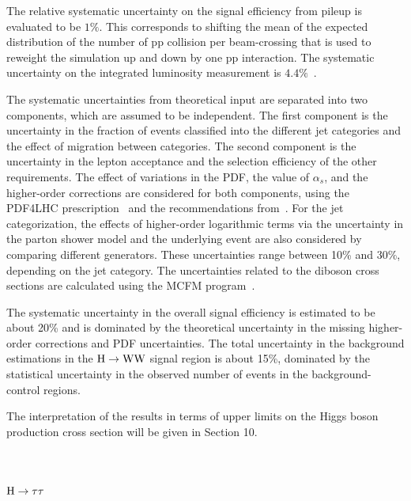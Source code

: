 \documentclass[12pt,twoside,a4paper,cmspaper,final,collab]{cms-tdr}
\begin{document}
The relative systematic uncertainty on the signal efficiency from pileup is evaluated to be $1\%$.
This corresponds to shifting the mean of the
expected distribution of the number of pp collision per beam-crossing that is used to reweight the simulation
up and down by one pp interaction.
The systematic uncertainty on the integrated luminosity measurement is $4.4\%$~\cite{CMS:2012jza}.

The systematic uncertainties from theoretical input  are separated
into two components, which are assumed to be
independent. The first component is the uncertainty in the fraction of
events classified into the different jet categories and the effect of migration between categories.
The second component is the uncertainty in
the lepton acceptance and the selection efficiency of the other
requirements. The effect of variations in the PDF, the
value of $\alpha_{s}$, and the higher-order corrections
are considered for both components, using the PDF4LHC
prescription~\cite{Botje:2011sn,Alekhin:2011sk,Lai:2010vv,Martin:2009iq,Ball:2011mu} and the recommendations
from~\cite{LHCHiggsCrossSectionWorkingGroup:2011ti}.
For the jet categorization, the effects of higher-order logarithmic terms via
the uncertainty in the parton shower model and the underlying event
are also considered by comparing different generators. These uncertainties range
between 10\% and 30\%, depending on the jet category.
The uncertainties related to the diboson
cross sections are calculated using the {\sc MCFM} program~\cite{MCFM}.

The systematic uncertainty in the overall signal efficiency is estimated to be about 20\%
and is dominated by the theoretical uncertainty in the missing
higher-order corrections and PDF uncertainties. The total uncertainty in the background estimations
in the $\mathrm{H}\to\mathrm{W}\mathrm{W}$ signal region is about 15\%, dominated by the
statistical uncertainty in the observed number of events in the background-control regions.

The interpretation of the results in terms of upper limits on the
Higgs boson production cross section will be given in Section 10.
\section{\texorpdfstring{$\mathrm{H}\to\tau\tau$}{H to tau tau}\label{sec:htt}}
\end{document}
